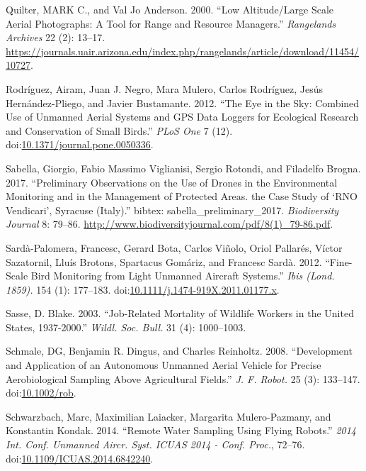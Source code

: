 \documentclass[]{interact}
\theoremstyle{plain}%
\theoremstyle{definition}
\theoremstyle{remark}
\begin{document}
\hypertarget{ref-quilter_low_2000}{}
Quilter, MARK C., and Val Jo Anderson. 2000. ``Low Altitude/Large Scale
Aerial Photographs: A Tool for Range and Resource Managers.''
\emph{Rangelands Archives} 22 (2): 13--17.
\url{https://journals.uair.arizona.edu/index.php/rangelands/article/download/11454/10727}.

\hypertarget{ref-rodriguez_eye_2012}{}
Rodríguez, Airam, Juan J. Negro, Mara Mulero, Carlos Rodríguez, Jesús
Hernández-Pliego, and Javier Bustamante. 2012. ``The Eye in the Sky:
Combined Use of Unmanned Aerial Systems and GPS Data Loggers for
Ecological Research and Conservation of Small Birds.'' \emph{PLoS One} 7
(12).
doi:\href{https://doi.org/10.1371/journal.pone.0050336}{10.1371/journal.pone.0050336}.

\hypertarget{ref-sabella_preliminary_2017}{}
Sabella, Giorgio, Fabio Massimo Viglianisi, Sergio Rotondi, and
Filadelfo Brogna. 2017. ``Preliminary Observations on the Use of Drones
in the Environmental Monitoring and in the Management of Protected
Areas. the Case Study of `RNO Vendicari', Syracuse (Italy).'' bibtex:
sabella\_preliminary\_2017. \emph{Biodiversity Journal} 8: 79--86.
\url{http://www.biodiversityjournal.com/pdf/8(1)_79-86.pdf}.

\hypertarget{ref-sarda-palomera_fine-scale_2012}{}
Sardà-Palomera, Francesc, Gerard Bota, Carlos Viñolo, Oriol Pallarés,
Víctor Sazatornil, Lluís Brotons, Spartacus Gomáriz, and Francesc Sardà.
2012. ``Fine-Scale Bird Monitoring from Light Unmanned Aircraft
Systems.'' \emph{Ibis (Lond. 1859).} 154 (1): 177--183.
doi:\href{https://doi.org/10.1111/j.1474-919X.2011.01177.x}{10.1111/j.1474-919X.2011.01177.x}.

\hypertarget{ref-sasse_job-related_2003}{}
Sasse, D. Blake. 2003. ``Job-Related Mortality of Wildlife Workers in
the United States, 1937-2000.'' \emph{Wildl. Soc. Bull.} 31 (4):
1000--1003.

\hypertarget{ref-schmale_development_2008}{}
Schmale, DG, Benjamin R. Dingus, and Charles Reinholtz. 2008.
``Development and Application of an Autonomous Unmanned Aerial Vehicle
for Precise Aerobiological Sampling Above Agricultural Fields.''
\emph{J. F. Robot.} 25 (3): 133--147.
doi:\href{https://doi.org/10.1002/rob}{10.1002/rob}.

\hypertarget{ref-schwarzbach_remote_2014}{}
Schwarzbach, Marc, Maximilian Laiacker, Margarita Mulero-Pazmany, and
Konstantin Kondak. 2014. ``Remote Water Sampling Using Flying Robots.''
\emph{2014 Int. Conf. Unmanned Aircr. Syst. ICUAS 2014 - Conf. Proc.},
72--76.
doi:\href{https://doi.org/10.1109/ICUAS.2014.6842240}{10.1109/ICUAS.2014.6842240}.
\end{document}
